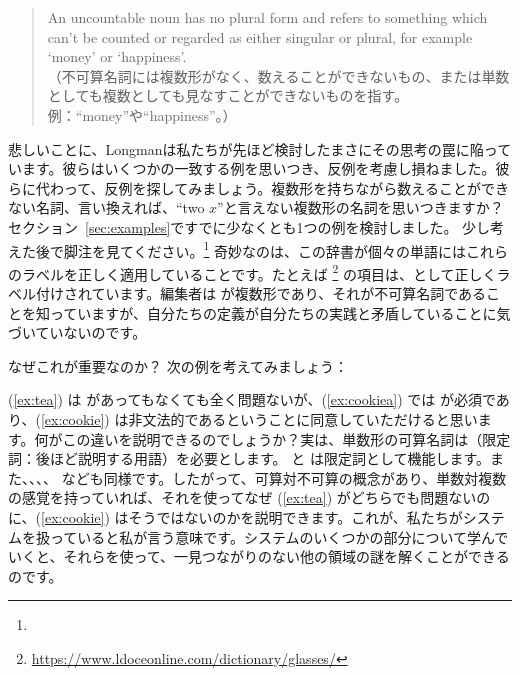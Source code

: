 \begin{quote}
    An uncountable noun has no plural form and refers to something which can't be counted or regarded as either singular or plural, for example `money' or `happiness'.\\
    （不可算名詞には複数形がなく、数えることができないもの、または単数としても複数としても見なすことができないものを指す。例：\enquote{money}や\enquote{happiness}。）
\end{quote}
悲しいことに、Longmanは私たちが先ほど検討したまさにその思考の罠に陥っています。彼らはいくつかの一致する例を思いつき、反例を考慮し損ねました。彼らに代わって、反例を探してみましょう。複数形を持ちながら数えることができない名詞、言い換えれば、\enquote{two $x$}と言えない複数形の名詞を思いつきますか？セクション~\ref{sec:examples}ですでに少なくとも1つの例を検討しました。 少し考えた後で脚注を見てください。\footnote{
} 奇妙なのは、この辞書が個々の単語にはこれらのラベルを正しく適用していることです。たとえば \footnote{\url{https://www.ldoceonline.com/dictionary/glasses/}} の項目は、として正しくラベル付けされています。編集者は  が複数形であり、それが不可算名詞であることを知っていますが、自分たちの定義が自分たちの実践と矛盾していることに気づいていないのです。


\begin{tblsframed}{なぜこれが重要なのか？}
    次の例を考えてみましょう：

    \ea
        \label{ex:tea}
        \label{ex:cookiea}
        \label{ex:cookie}
        \z\label{ex:blank}
    \z
    (\ref{ex:tea}) は  があってもなくても全く問題ないが、(\ref{ex:cookiea}) では  が必須であり、(\ref{ex:cookie}) は非文法的であるということに同意していただけると思います。何がこの違いを説明できるのでしょうか？実は、単数形の可算名詞は（限定詞：後ほど説明する用語）を必要とします。 と  は限定詞として機能します。また、、、、 なども同様です。したがって、可算対不可算の概念があり、単数対複数の感覚を持っていれば、それを使ってなぜ (\ref{ex:tea}) がどちらでも問題ないのに、(\ref{ex:cookie}) はそうではないのかを説明できます。これが、私たちがシステムを扱っていると私が言う意味です。システムのいくつかの部分について学んでいくと、それらを使って、一見つながりのない他の領域の謎を解くことができるのです。
\end{tblsframed}

